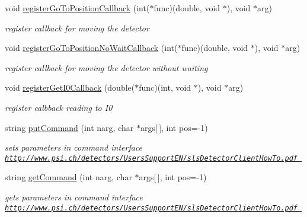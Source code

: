 \begin{CompactItemize}
void \hyperlink{classslsDetectorUsers_0f7c9bd3c46647d5dda2fa5312f3ef92}{register\-Go\-To\-Position\-Callback} (int($\ast$func)(double, void $\ast$), void $\ast$arg)
\begin{CompactList}\small\item\em register callback for moving the detector \item\end{CompactList}\item 
void \hyperlink{classslsDetectorUsers_e807e9f4a015a4bbcb22e36b80577ea5}{register\-Go\-To\-Position\-No\-Wait\-Callback} (int($\ast$func)(double, void $\ast$), void $\ast$arg)
\begin{CompactList}\small\item\em register callback for moving the detector without waiting \item\end{CompactList}\item 
void \hyperlink{classslsDetectorUsers_1969785197030aa8e2d3c3d48a9cb45c}{register\-Get\-I0Callback} (double($\ast$func)(int, void $\ast$), void $\ast$arg)
\begin{CompactList}\small\item\em register calbback reading to I0 \item\end{CompactList}\item 
string \hyperlink{classslsDetectorUsers_5f7c26833decef59c1abfd7d745c4671}{put\-Command} (int narg, char $\ast$args\mbox{[}$\,$\mbox{]}, int pos=-1)
\begin{CompactList}\small\item\em sets parameters in command interface \href{http://www.psi.ch/detectors/UsersSupportEN/slsDetectorClientHowTo.pdf}\tt{http://www.psi.ch/detectors/Users\-Support\-EN/sls\-Detector\-Client\-How\-To.pdf} \item\end{CompactList}\item 
string \hyperlink{classslsDetectorUsers_dc83b8005abccc735b35464c1c6d3ea7}{get\-Command} (int narg, char $\ast$args\mbox{[}$\,$\mbox{]}, int pos=-1)
\begin{CompactList}\small\item\em gets parameters in command interface \href{http://www.psi.ch/detectors/UsersSupportEN/slsDetectorClientHowTo.pdf}\tt{http://www.psi.ch/detectors/Users\-Support\-EN/sls\-Detector\-Client\-How\-To.pdf} \item\end{CompactList}\end{CompactItemize}
